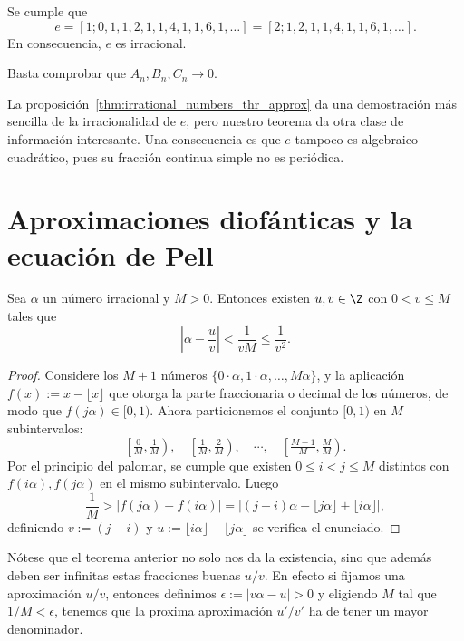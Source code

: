 \documentclass[teoria-numeros.tex]{subfiles}
\begin{document}
\begin{thm}
	Se cumple que
	$$ e = [1; 0, 1, 1, 2, 1, 1, 4, 1, 1, 6, 1, \dots] = [2; 1, 2, 1, 1, 4, 1, 1, 6, 1, \dots]. $$
	En consecuencia, $e$ es irracional.
\end{thm}
\begin{hint}
	Basta comprobar que $A_n, B_n, C_n \to 0$.
\end{hint}
La proposición~\ref{thm:irrational_numbers_thr_approx} da una demostración más sencilla de la irracionalidad de $e$, pero
nuestro teorema da otra clase de información interesante.
Una consecuencia es que $e$ tampoco es algebraico cuadrático, pues su fracción continua simple no es periódica.

\section{Aproximaciones diofánticas y la ecuación de Pell}%
\label{sec:basic_diophantine_approx}

\begin{thmi}
	Sea $\alpha$ un número irracional y $M > 0$. Entonces existen $u, v \in \Z$ con $0 < v \le M$ tales que
	$$ \left| \alpha - \frac{u}{v} \right| < \frac{1}{vM} \le \frac{1}{v^2}. $$
\end{thmi}
\begin{proof}
	Considere los $M + 1$ números $\{ 0\cdot\alpha, 1\cdot\alpha, \dots, M\alpha \}$, y la aplicación $f(x) := x - \lfloor x \rfloor $
	que otorga la parte fraccionaria o decimal de los números, de modo que $f(j\alpha) \in [0, 1)$.
	Ahora particionemos el conjunto $[0, 1)$ en $M$ subintervalos:
	$$ \left[ \tfrac{0}{M}, \tfrac{1}{M} \right), \quad \left[ \tfrac{1}{M}, \tfrac{2}{M} \right), \quad \cdots,
	\quad \left[ \tfrac{M-1}{M}, \tfrac{M}{M} \right). $$
	Por el principio del palomar, se cumple que existen $0 \le i < j \le M$ distintos con $f(i\alpha), f(j\alpha)$ en el mismo subintervalo.
	Luego
	$$ \frac{1}{M} > |f(j\alpha) - f(i\alpha)| = | (j - i)\alpha - \lfloor j\alpha \rfloor + \lfloor i\alpha \rfloor |, $$
	definiendo $v := (j - i)$ y $u := \lfloor i\alpha \rfloor - \lfloor j\alpha \rfloor$ se verifica el enunciado.
\end{proof}
Nótese que el teorema anterior no solo nos da la existencia, sino que además deben ser infinitas estas fracciones buenas $u/v$.
En efecto si fijamos una aproximación $u/v$, entonces definimos $\epsilon := |v\alpha - u| > 0$ y eligiendo $M$ tal que $1/M < \epsilon$,
tenemos que la proxima aproximación $u'/v'$ ha de tener un mayor denominador.
\end{document}
